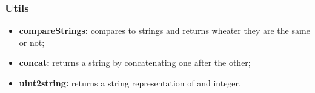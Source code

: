 \subsubsection{Utils}
\begin{itemize}
	\item \textbf{compareStrings:} compares to strings and returns wheater they are the same or not;
	\item \textbf{concat:} returns a string by concatenating one after the other;
	\item \textbf{uint2string:} returns a string representation of and integer.
\end{itemize}